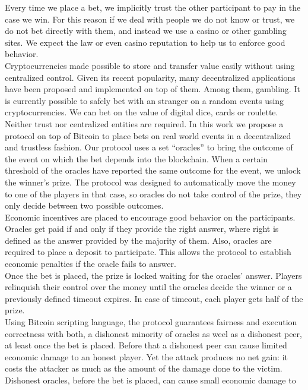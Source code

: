 Every time we place a bet, we implicitly trust the other participant  to pay in
  the case we win.
For this reason if we deal with people we do not know or trust, we do not bet
  directly with them, and instead we use a casino or other gambling sites.
We expect the law or even casino reputation to help us to enforce good
  behavior.\\
\noindent
Cryptocurrencies made possible to store and transfer value easily without
  using centralized control.
Given its recent popularity, many decentralized applications have been proposed
  and implemented on top of them.
Among them, gambling.
It is currently possible to safely bet with an stranger on a random events
  using cryptocurrencies.
We can bet on the value of digital dice, cards or roulette.
Neither trust nor centralized entities are required.
In this work we propose a protocol on top of Bitcoin to place bets on real world
  events in a decentralized and trustless fashion.
\noindent
Our protocol uses a set ``oracles'' to bring the outcome of the event on which
  the bet depends into the blockchain.
When a certain threshold of the oracles have reported the same outcome for
  the event, we unlock the winner's prize.
The protocol was designed to automatically move the money to one of the players
  in that case, so oracles do not take control of the prize, they only decide
  between two possible outcomes.\\
\noindent
Economic incentives are placed to encourage good behavior on the participants.
Oracles get paid if and only if they provide the right answer, where right is
  defined as the answer provided by the majority of them.
Also, oracles are required to place a deposit to participate.
This allows the protocol to establish economic penalties if the oracle fails to
  answer.\\
\noindent
Once the bet is placed, the prize is locked waiting for the oracles' answer.
Players relinquish their control over the money until the oracles decide the
  winner or a previously defined timeout expires.
In case of timeout, each player gets half of the prize.\\
\noindent
Using Bitcoin scripting language, the protocol guarantees fairness and execution
  correctness with both, a dishonest minority of oracles as weel as a dishonest
  peer, at least once the bet is placed.
Before that a dishonest peer can cause limited economic damage to an honest
  player.
Yet the attack produces no net gain: it costs the attacker as much as the amount
  of the damage done to the victim.
Dishonest oracles, before the bet is placed, can cause small economic damage to
